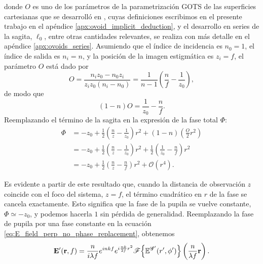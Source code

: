 donde $O$ es uno de los parámetros de la parametrización GOTS de las superficies cartesianas que se desarrolló en \cite{singlet2020}, cuyas definiciones escribimos en el presente trabajo en el apéndice \ref{apx:ovoid_implicit_deduction}, y el desarrollo en series de la sagita, $\ell_0$, entre otras cantidades relevantes, se realiza con más detalle en el apéndice \ref{apx:ovoids_series}. Asumiendo que el índice de incidencia es $n_0=1$, el índice de salida es $n_i=n$, y la posición de la imagen estigmática es $z_i=f$, el parámetro $O$ está dado por
\begin{equation}
    O
    =
    \frac{n_i z_0 - n_0 z_i}{z_i z_0 (n_i - n_0)}
    =
    \frac{1}{n - 1}
    \left(
    \frac{n}{f}
    -
    \frac{1}{z_0}
    \right),
\end{equation}
de modo que
\begin{equation}
    (1-n)O
    =
    \frac{1}{z_0}
    -
    \frac{n}{f}.
\end{equation}
Reemplazando el término de la sagita en la expresión de la fase total $\Phi$:
\begin{align}
    \Phi
    &=
    -z_0
    +
    \frac{1}{2}
    \left(
    \frac{n}{z}
    -
    \frac{1}{z_0}
    \right)r^2
    +
    (1-n)
    \left(
    \frac{O}{2}r^2
    \right)
    \nonumber
    \\
    &=
    -z_0
    +
    \frac{1}{2}
    \left(
    \frac{n}{z}
    -
    \frac{1}{z_0}
    \right)r^2
    +
    \frac{1}{2}
    \left(
    \frac{1}{z_0}
    -
    \frac{n}{f}
    \right)r^2
    \nonumber
    \\
    &=
    -z_0
    +
    \frac{1}{2}
    \left(
    \frac{n}{z}
    -
    \frac{n}{f}
    \right)r^2
    +
    \mathcal{O}(r^4).
\end{align}

Es evidente a partir de este resultado que, cuando la distancia de observación $z$ coincide con el foco del sistema, $z=f$, el término cuadrático en $r$ de la fase se cancela exactamente. Esto significa que la fase de la pupila se vuelve constante, $\Phi\simeq -z_0$, y podemos hacerla $1$ sin pérdida de generalidad. Reemplazando la fase de pupila por una fase constante en la ecuación \eqref{eq:E_field_perp_no_phase_replacement}, obtenemos
\begin{equation}
  \vb E'(\vb r, f)
  =
  \frac{n}{i\lambda f}e^{inkf}e^{i\frac{nk}{2f}r^2}
  \mathscr F
  \Big\{
  \mathbb E^{\mathscr G'}(r', \phi')
  \Big\}
  \left(
  \frac{n}{\lambda f}\vb r
  \right).
  \label{eq:E_field_pupil_phase_and_TT}
\end{equation}

